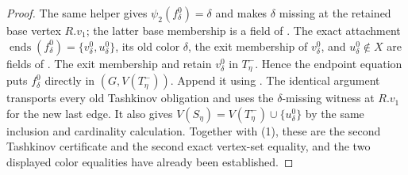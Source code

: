 \begin{proof}
The same helper gives $\psi_2(f^0_\delta)=\delta$ and makes $\delta$
missing at the retained base vertex $R.v_1$; the latter base membership
is a field of .  The exact attachment
$\operatorname{ends}(f^0_\delta)=\{v^0_\delta,u^0_\delta\}$, its old
color $\delta$, the exit membership of $v^0_\delta$, and
$u^0_\delta\notin X$ are fields of
.  The exit membership and
 retain $v^0_\delta$ in
$T^-_\eta$.  Hence the endpoint equation puts $f^0_\delta$ directly in
$(G,V(T^-_\eta))$.  Append it using
.  The identical
 argument transports every old
Tashkinov obligation and uses the $\delta$-missing witness at $R.v_1$
for the new last edge.  It also gives
$V(S_\eta)=V(T^-_\eta)\cup\{u^0_\delta\}$ by the same inclusion and
cardinality calculation.  Together with (1), these are the second
Tashkinov certificate and the second exact vertex-set equality, and the
two displayed color equalities have already been established.
\end{proof}
